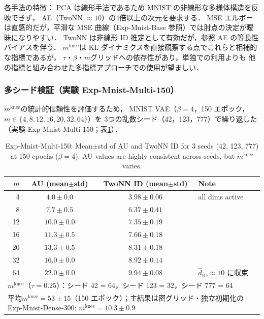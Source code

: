 \documentclass[11pt,a4paper]{jsarticle}
\newcommand{\mknee}{m^{\mathrm{knee}}}
\begin{document}
各手法の特徴：
PCA は線形手法であるため MNIST の非線形な多様体構造を反映できず，
AE（TwoNN $\approx 10$）の4倍以上の次元を要求する．
MSE エルボーは直感的だが，平滑な MSE 曲線（Exp-Mnist-Base 参照）では肘点の決定が曖昧になりやすい．
TwoNN は非線形 ID 推定として有効だが，参照 AE の等長性バイアスを伴う．
$\mknee$は KL ダイナミクスを直接観察する点でこれらと相補的な指標であるが，
$\tau$・$\beta$・$m$グリッドへの依存性があり，単独での利用よりも
他の指標と組み合わせた多指標アプローチでの使用が望ましい．

\subsubsection{多シード検証（実験 Exp-Mnist-Multi-150）}\label{sec:exp_multiseed}

$\mknee$の統計的信頼性を評価するため，
MNIST VAE（$\beta = 4$，150 エポック，$m \in \{4,8,12,16,20,32,64\}$）を
3つの乱数シード（42，123，777）で繰り返した（実験 Exp-Mnist-Multi-150；表\ref{tab:e4_multiseed}）．

\begin{table}[H]
\centering
\caption{Exp-Mnist-Multi-150: Mean$\pm$std of AU and TwoNN ID for 3 seeds (42, 123, 777) at 150 epochs ($\beta=4$). AU values are highly consistent across seeds, but $\mknee$ varies.}
\label{tab:e4_multiseed}
\small
\begin{tabular}{rccl}
\toprule
$m$ & AU (mean$\pm$std) & TwoNN ID (mean$\pm$std) & Note \\
\midrule
 4 & $4.0 \pm 0.0$ & $3.98 \pm 0.06$ & all dims active \\
 8 & $7.7 \pm 0.5$ & $6.37 \pm 0.41$ & \\
12 & $10.0 \pm 0.0$ & $7.35 \pm 0.19$ & \\
16 & $11.3 \pm 0.5$ & $7.66 \pm 0.18$ & \\
20 & $13.3 \pm 0.5$ & $8.31 \pm 0.18$ & \\
32 & $16.0 \pm 0.0$ & $8.92 \pm 0.14$ & \\
64 & $22.0 \pm 0.0$ & $9.94 \pm 0.08$ & $\hat{d}_\mathrm{ID} \approx 10$ に収束 \\
\midrule
\multicolumn{4}{l}{$\mknee$（$\tau=0.25$）：シード 42 = 64，シード 123 = 32，シード 777 = 64} \\
\multicolumn{4}{l}{平均$\mknee = 53 \pm 15$（150 エポック）；主結果は密グリッド・独立初期化の Exp-Mnist-Dense-300: $\mknee = 10.3 \pm 0.9$} \\
\bottomrule
\end{tabular}
\end{table}
\end{document}
